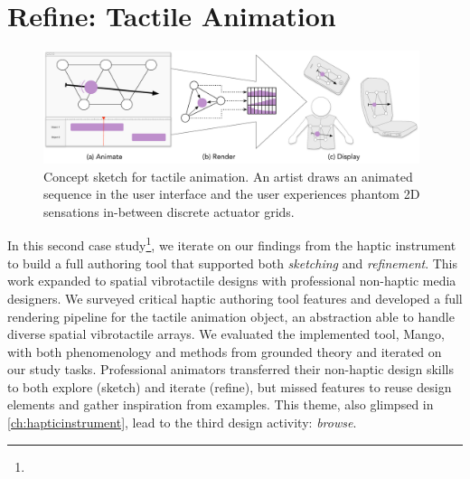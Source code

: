 

\newcommand{\qq}[2]{\emph{``#1"} (#2)}
\newcommand{\HAtheme}[2]{\textbf{Theme #1:} \uline{#2}\\}



\chapter{Refine: Tactile Animation}
\label{ch:tactileanimation}

\begin{figure}[h]
   \includegraphics[width=0.98\textwidth]{images/HA14-Concept-Sketch-2015-01-17-1127}
   \caption{Concept sketch for tactile animation. 
An artist draws an animated sequence in the user interface and the user experiences phantom 2D sensations in-between discrete actuator grids. 
}
   \label{fig:concept:sketch}
\end{figure}

  

\noindent
{} In this second case study\footnote{}, we iterate on our findings from the haptic instrument to build a full authoring tool that supported both \emph{sketching} and \emph{refinement}.
This work expanded to spatial vibrotactile designs with professional non-haptic media designers.
We surveyed critical haptic authoring tool features and developed a full rendering pipeline for the tactile animation object, an abstraction able to handle diverse spatial vibrotactile arrays. %
We evaluated the implemented tool, Mango, with both phenomenology and methods from grounded theory and iterated on our study tasks.
Professional animators transferred their non-haptic design skills to both explore (sketch) and iterate (refine), but missed features to reuse design elements and gather inspiration from examples.
This theme, also glimpsed in \autoref{ch:hapticinstrument}, lead to the third design activity: \emph{browse}.

